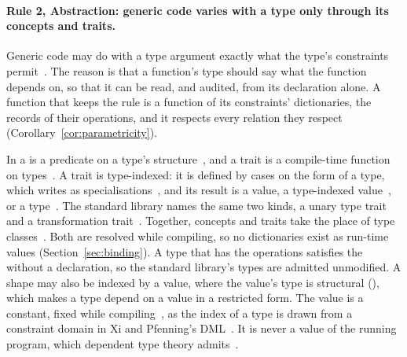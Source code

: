 \paragraph{Rule 2, Abstraction: generic code varies with a type only through its concepts and traits.}
\label{def:rule2}
Generic code may do with a type argument exactly what the type's constraints permit~\cite{reynolds1983types,wadler1989theorems}.
The reason is that a function's type should say what the function depends on, so that it can be read, and audited, from its declaration alone.
A function that keeps the rule is a function of its constraints' dictionaries, the records of their operations, and it respects every relation they respect (Corollary~\ref{cor:parametricity}).

In  a  is a predicate on a type's structure~\cite{cpp23standard}, and a trait is a compile-time function on types~\cite{myers1995traits}.
A trait is type-indexed: it is defined by cases on the form of a type, which \Cpp{} writes as specialisations~\cite[{\texttt{temp.spec.partial}}]{cpp23standard}, and its result is a value, a type-indexed value~\cite{hinze2000generic}, or a type~\cite{hinze2004typeindexed}.
The standard library names the same two kinds, a unary type trait and a transformation trait~\cite[{\texttt{meta.rqmts}}]{cpp23standard}.
Together, concepts and traits take the place of type classes~\cite{wadler1989adhoc}.
Both are resolved while compiling, so no dictionaries exist as run-time values (Section~\ref{sec:binding}).
A type that has the operations satisfies the  without a declaration, so the standard library's types are admitted unmodified.
A shape may also be indexed by a value, where the value's type is structural (\RuleOne{}), which makes a type depend on a value in a restricted form.
The value is a constant, fixed while compiling~\cite[{\texttt{temp.param}}]{cpp23standard}, as the index of a type is drawn from a constraint domain in Xi and Pfenning's DML~\cite{xi1999dependent}.
It is never a value of the running program, which dependent type theory admits~\cite{martinlof1984intuitionistic}.

